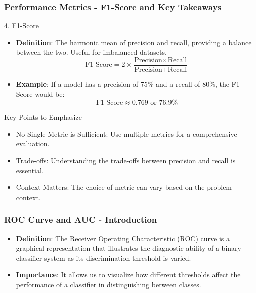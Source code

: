\documentclass[aspectratio=169]{beamer}
\begin{document}
\begin{frame}[fragile]
    \frametitle{Performance Metrics - F1-Score and Key Takeaways}
    \begin{block}{4. F1-Score}
        \begin{itemize}
            \item \textbf{Definition}: The harmonic mean of precision and recall, providing a balance between the two. Useful for imbalanced datasets.
            \begin{equation}
                \text{F1-Score} = 2 \times \frac{\text{Precision} \times \text{Recall}}{\text{Precision} + \text{Recall}}
            \end{equation}
            \item \textbf{Example}: If a model has a precision of 75\% and a recall of 80\%, the F1-Score would be:
            \begin{equation}
                \text{F1-Score} \approx 0.769 \text{ or } 76.9\%
            \end{equation}
        \end{itemize}
    \end{block}
    
    \begin{block}{Key Points to Emphasize}
        \begin{itemize}
            \item No Single Metric is Sufficient: Use multiple metrics for a comprehensive evaluation.
            \item Trade-offs: Understanding the trade-offs between precision and recall is essential.
            \item Context Matters: The choice of metric can vary based on the problem context.
        \end{itemize}
    \end{block}
\end{frame}

\begin{frame}[fragile]
    \frametitle{ROC Curve and AUC - Introduction}
    \begin{itemize}
        \item \textbf{Definition}: The Receiver Operating Characteristic (ROC) curve is a graphical representation that illustrates the diagnostic ability of a binary classifier system as its discrimination threshold is varied.
        \item \textbf{Importance}: It allows us to visualize how different thresholds affect the performance of a classifier in distinguishing between classes.
    \end{itemize}
\end{frame}
\end{document}
